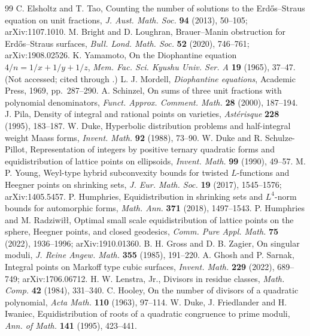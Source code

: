 \documentclass[10pt,reqno]{amsart}
\theoremstyle{definition}
\numberwithin{equation}{section}
\begin{document}
\begin{thebibliography}{99}
 C. Elsholtz and T. Tao, Counting the number of solutions to the Erd\H{o}s--Straus equation on unit fractions, \emph{J. Aust. Math. Soc.} \textbf{94} (2013), 50--105; arXiv:1107.1010.
 M. Bright and D. Loughran, Brauer--Manin obstruction for Erd\H{o}s--Straus surfaces, \emph{Bull. Lond. Math. Soc.} \textbf{52} (2020), 746--761; arXiv:1908.02526.
 K. Yamamoto, On the Diophantine equation $4/n=1/x+1/y+1/z$, \emph{Mem. Fac. Sci. Kyushu Univ. Ser. A} \textbf{19} (1965), 37--47. (Not accessed; cited through \cite[App.~A]{BL}.)
 L. J. Mordell, \emph{Diophantine equations}, Academic Press, 1969, pp.~287--290.
 A. Schinzel, On sums of three unit fractions with polynomial denominators, \emph{Funct. Approx. Comment. Math.} \textbf{28} (2000), 187--194.
 J. Pila, Density of integral and rational points on varieties, \emph{Ast\'erisque} \textbf{228} (1995), 183--187.
 W. Duke, Hyperbolic distribution problems and half-integral weight Maass forms, \emph{Invent. Math.} \textbf{92} (1988), 73--90.
 W. Duke and R. Schulze-Pillot, Representation of integers by positive ternary quadratic forms and equidistribution of lattice points on ellipsoids, \emph{Invent. Math.} \textbf{99} (1990), 49--57.
 M. P. Young, Weyl-type hybrid subconvexity bounds for twisted $L$-functions and Heegner points on shrinking sets, \emph{J. Eur. Math. Soc.} \textbf{19} (2017), 1545--1576; arXiv:1405.5457.
 P. Humphries, Equidistribution in shrinking sets and $L^4$-norm bounds for automorphic forms, \emph{Math. Ann.} \textbf{371} (2018), 1497--1543.
 P. Humphries and M. Radziwi\l\l, Optimal small scale equidistribution of lattice points on the sphere, Heegner points, and closed geodesics, \emph{Comm. Pure Appl. Math.} \textbf{75} (2022), 1936--1996; arXiv:1910.01360.
 B. H. Gross and D. B. Zagier, On singular moduli, \emph{J. Reine Angew. Math.} \textbf{355} (1985), 191--220.
 A. Ghosh and P. Sarnak, Integral points on Markoff type cubic surfaces, \emph{Invent. Math.} \textbf{229} (2022), 689--749; arXiv:1706.06712.
 H. W. Lenstra, Jr., Divisors in residue classes, \emph{Math. Comp.} \textbf{42} (1984), 331--340.
 C. Hooley, On the number of divisors of a quadratic polynomial, \emph{Acta Math.} \textbf{110} (1963), 97--114.
 W. Duke, J. Friedlander and H. Iwaniec, Equidistribution of roots of a quadratic congruence to prime moduli, \emph{Ann. of Math.} \textbf{141} (1995), 423--441.

\end{thebibliography}
\end{document}
